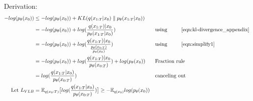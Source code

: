 Derivation:
\begingroup
\small
\begin{subequations}
	\label{eqn:vlb2_appendix}
	\begin{align}
		-log(p_\theta(x_0)) &\leq -log(p_\theta(x_0)) + KL(q(x_{1:T}|x_0) \parallel p_\theta(x_{1:T}|x_0)) &&\textrm{}\\
		&= -log(p_\theta(x_0)) + log(\frac{q(x_{1:T})|x_0}{p_\theta(x_{1:T}|x_0)}) && \textrm{using \Autoref{eqn:kl-divergence_appendix}}\\
		&=-log(p_\theta(x_0)) + log(\frac{q(x_{1:T})|x_0}{\frac{p_\theta(x_{0:T})}{p_\theta(x_{0})}}) && \textrm{using \Autoref{eqn:simplify1}}\\
		&= -log(p_\theta(x_0)) + log(\frac{q(x_{1:T})|x_0}{p_\theta(x_{0:T})})+log(p_\theta(x_{0})) && \textrm{Fraction rule}\\
		&= log(\frac{q(x_{1:T}|x_0)}{p_\theta(x_{0:T})})	&& \textrm{canceling out}\\
		\textrm{Let }L_{VLB} &= \mathbb{E}_{q(x_0:T)}\big[log(\frac{q(x_{1:T}|x_0)}{p_\theta(x_{0:T})}) \big] \geq - \mathbb{E}_{q(x_0)}log(p_\theta(x_0))
	\end{align}
\end{subequations}
\endgroup



